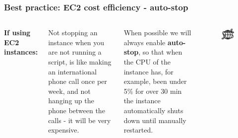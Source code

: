 \documentclass[aspectratio=169]{beamer} %
\begin{document}
\begin{frame}
	\frametitle{Best practice: EC2 cost efficiency - auto-stop}

	\begin{columns}[c]


		\textbf{If using EC2 instances:}
		
		\vspace{.5cm}
		
		Not stopping an instance when you are not running a script,
		is like making an international phone call once per week,
		and not hanging up the phone between the calls
		- it will be very expensive.

		\vspace{.5cm}

		When possible we will always enable \textbf{auto-stop},
		so that when the CPU of the instance has,
		for example, been under 5\% for over 30 min the instance
		automatically shuts down until manually restarted.


		\begin{figure}
			\centering
			\includegraphics[width=\textwidth]{./img/international-call.png}
		\end{figure}

	\end{columns}
\end{frame}
\end{document}

